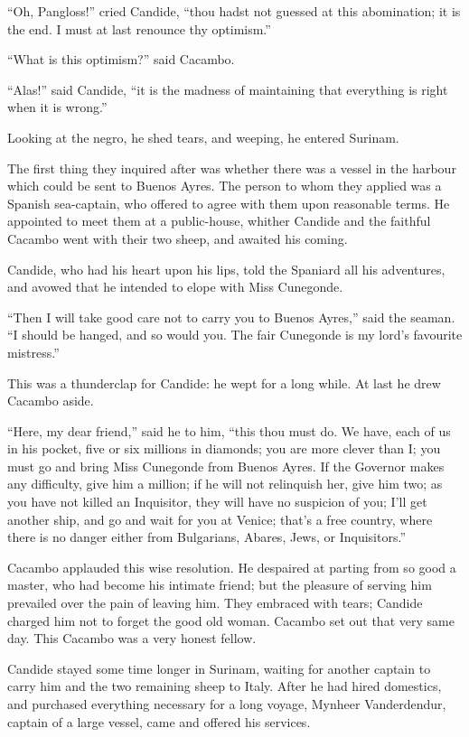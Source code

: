 ``Oh, Pangloss!'' cried Candide, ``thou hadst not guessed at this abomination; it is the end. I must at last renounce thy optimism.''

``What is this optimism?'' said Cacambo.

``Alas!'' said Candide, ``it is the madness of maintaining that everything is right when it is wrong.''

Looking at the negro, he shed tears, and weeping, he entered Surinam.

The first thing they inquired after was whether there was a vessel in the harbour which could be sent to Buenos Ayres. The person to whom they applied was a Spanish sea-captain, who offered to agree with them upon reasonable terms. He appointed to meet them at a public-house, whither Candide and the faithful Cacambo went with their two sheep, and awaited his coming.

Candide, who had his heart upon his lips, told the Spaniard all his adventures, and avowed that he intended to elope with Miss Cunegonde.

``Then I will take good care not to carry you to Buenos Ayres,'' said the seaman. ``I should be hanged, and so would you. The fair Cunegonde is my lord's favourite mistress.''

This was a thunderclap for Candide: he wept for a long while. At last he drew Cacambo aside.

``Here, my dear friend,'' said he to him, ``this thou must do. We have, each of us in his pocket, five or six millions in diamonds; you are more clever than I; you must go and bring Miss Cunegonde from Buenos Ayres. If the Governor makes any difficulty, give him a million; if he will not relinquish her, give him two; as you have not killed an Inquisitor, they will have no suspicion of you; I'll get another ship, and go and wait for you at Venice; that's a free country, where there is no danger either from Bulgarians, Abares, Jews, or Inquisitors.''

Cacambo applauded this wise resolution. He despaired at parting from so good a master, who had become his intimate friend; but the pleasure of serving him prevailed over the pain of leaving him. They embraced with tears; Candide charged him not to forget the good old woman. Cacambo set out that very same day. This Cacambo was a very honest fellow.

Candide stayed some time longer in Surinam, waiting for another captain to carry him and the two remaining sheep to Italy. After he had hired domestics, and purchased everything necessary for a long voyage, Mynheer Vanderdendur, captain of a large vessel, came and offered his services.

